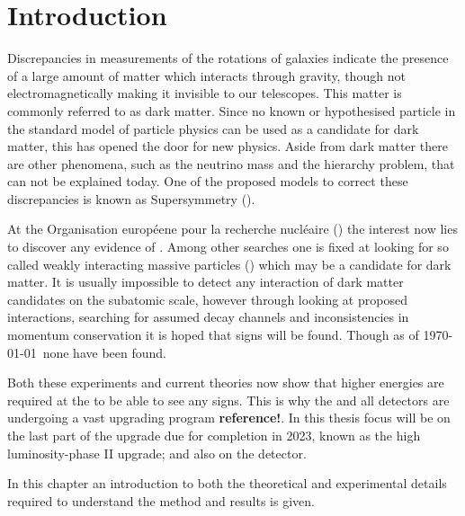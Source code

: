 \chapter{Introduction}\label{cha:intro}
Discrepancies in measurements of the rotations of galaxies indicate the presence of a large amount of matter which interacts through gravity, though not electromagnetically making it invisible to our telescopes. This matter is commonly referred to as dark matter. Since no known or hypothesised particle in the standard model of particle physics can be used as a candidate for dark matter, this has opened the door for new physics. Aside from dark matter there are other phenomena, such as the neutrino mass and the hierarchy problem, that can not be explained today. One of the proposed models to correct these discrepancies is known as Supersymmetry (\abbrSUSY).  

At the Organisation européene pour la recherche nucléaire (\abbrCERN) the interest now lies to discover any evidence of \abbrSUSY. Among other searches one is fixed at looking for so called weakly interacting massive particles (\abbrWIMPS) which may be a candidate for dark matter. It is usually impossible to detect any interaction of dark matter candidates on the subatomic scale, however through looking at proposed interactions, searching for assumed decay channels and inconsistencies in momentum conservation it is hoped that signs will be found. Though as of \today\ none have been found. 

Both these experiments and current theories now show that higher energies are required at the \abbrLHC to be able to see any signs. This is why the \abbrLHC and all detectors are undergoing a vast upgrading program \textbf{reference!}.
In this thesis focus will be on the last part of the upgrade due for completion in 2023, known as the high luminosity-\abbrLHC phase II upgrade; and also on the \abbrATLAS detector.

In this chapter an introduction to both the theoretical and experimental details required to understand the method and results is given. 

\newpage
